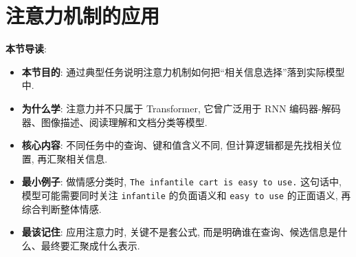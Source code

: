 \documentclass{../nndlcourse}
\begin{document}
\section{注意力机制的应用}

\textbf{本节导读}:
\begin{itemize}
  \item \textbf{本节目的}: 通过典型任务说明注意力机制如何把“相关信息选择”落到实际模型中.
  \item \textbf{为什么学}: 注意力并不只属于 Transformer, 它曾广泛用于 RNN 编码器-解码器、图像描述、阅读理解和文档分类等模型.
  \item \textbf{核心内容}: 不同任务中的查询、键和值含义不同, 但计算逻辑都是先找相关位置, 再汇聚相关信息.
  \item \textbf{最小例子}: 做情感分类时, \texttt{The infantile cart is easy to use.} 这句话中, 模型可能需要同时关注 \texttt{infantile} 的负面语义和 \texttt{easy to use} 的正面语义, 再综合判断整体情感.
  \item \textbf{最该记住}: 应用注意力时, 关键不是套公式, 而是明确谁在查询、候选信息是什么、最终要汇聚成什么表示.
\end{itemize}
\end{document}
